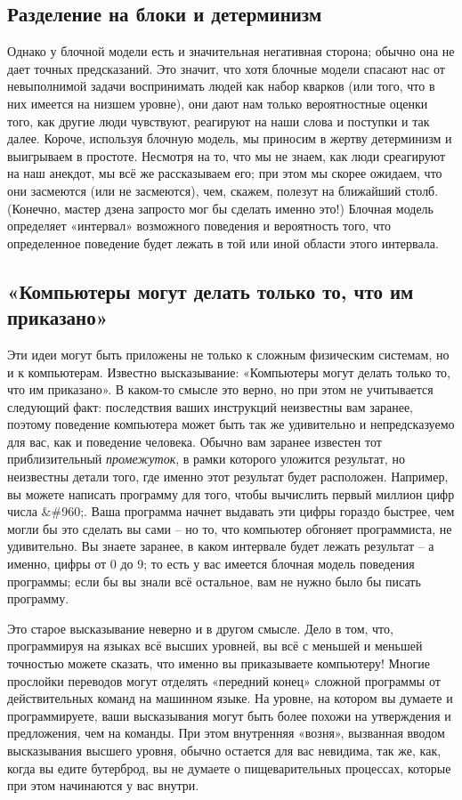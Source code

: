 \documentclass[../main.tex]{subfiles}
\begin{document}
\subsection{Разделение на блоки и детерминизм}

Однако у блочной модели есть и значительная негативная сторона; обычно она не дает точных предсказаний. Это значит, что хотя блочные модели спасают нас от невыполнимой задачи воспринимать людей как набор кварков (или того, что в них имеется на низшем уровне), они дают нам только вероятностные оценки того, как другие люди чувствуют, реагируют на наши слова и поступки и так далее. Короче, используя блочную модель, мы приносим в жертву детерминизм и выигрываем в простоте. Несмотря на то, что мы не знаем, как люди среагируют на наш анекдот, мы всё же рассказываем его; при этом мы скорее ожидаем, что они засмеются (или не засмеются), чем, скажем, полезут на ближайший столб. (Конечно, мастер дзена запросто мог бы сделать именно это!) Блочная модель определяет «интервал» возможного поведения и вероятность того, что определенное поведение будет лежать в той или иной области этого интервала.


\subsection{«Компьютеры могут делать только то, что им приказано»}

Эти идеи могут быть приложены не только к сложным физическим системам, но и к компьютерам. Известно высказывание: «Компьютеры могут делать только то, что им приказано». В каком-то смысле это верно, но при этом не учитывается следующий факт: последствия ваших инструкций неизвестны вам заранее, поэтому поведение компьютера может быть так же удивительно и непредсказуемо для вас, как и поведение человека. Обычно вам заранее известен тот приблизительный \emph{промежуток}, в рамки которого уложится результат, но неизвестны детали того, где именно этот результат будет расположен. Например, вы можете написать программу для того, чтобы вычислить первый миллион цифр числа \&\#960;. Ваша программа начнет выдавать эти цифры гораздо быстрее, чем могли бы это сделать вы сами \--- но то, что компьютер обгоняет программиста, не удивительно. Вы знаете заранее, в каком интервале будет лежать результат \--- а именно, цифры от 0 до 9; то есть у вас имеется блочная модель поведения программы; если бы вы знали всё остальное, вам не нужно было бы писать программу.

Это старое высказывание неверно и в другом смысле. Дело в том, что, программируя на языках всё высших уровней, вы всё с меньшей и меньшей точностью можете сказать, что именно вы приказываете компьютеру! Многие прослойки переводов могут отделять «передний конец» сложной программы от действительных команд на машинном языке. На уровне, на котором вы думаете и программируете, ваши высказывания могут быть более похожи на утверждения и предложения, чем на команды. При этом внутренняя «возня», вызванная вводом высказывания высшего уровня, обычно остается для вас невидима, так же, как, когда вы едите бутерброд, вы не думаете о пищеварительных процессах, которые при этом начинаются у вас внутри.
\end{document}

